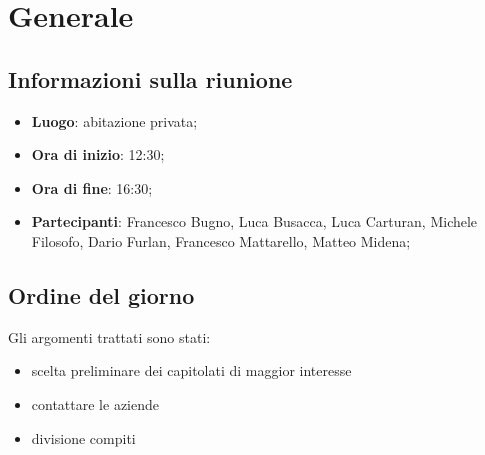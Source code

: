 \section{Generale}

\vspace{10pt}


\subsection{Informazioni sulla riunione}
\begin{itemize}
	\item \textbf{Luogo}: abitazione privata;
	\item \textbf{Ora di inizio}: 12:30;
	\item \textbf{Ora di fine}: 16:30;
	\item \textbf{Partecipanti}: Francesco Bugno, Luca Busacca, Luca Carturan, Michele Filosofo, Dario Furlan, Francesco Mattarello, Matteo Midena;
\end{itemize}

\vspace{5pt}

\subsection{Ordine del giorno}
Gli argomenti trattati sono stati:
\begin{itemize}
	\item scelta preliminare dei capitolati di maggior interesse
	\item contattare le aziende
	\item divisione compiti
\end{itemize}
